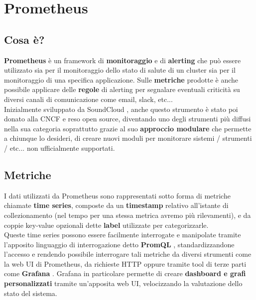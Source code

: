 \chapter{Prometheus} \label{chap:Prometheus}

\section{Cosa è?}
\textbf{Prometheus} è un framework di \textbf{monitoraggio} e di \textbf{alerting} che può essere utilizzato sia per il monitoraggio dello stato di salute di un cluster sia per il monitoraggio di una specifica applicazione. Sulle \textbf{metriche} prodotte è anche possibile applicare delle \textbf{regole} di alerting per segnalare eventuali criticità su diversi canali di comunicazione come email, slack, etc... \\
Inizialmente sviluppato da SoundCloud \cite{SoundCloud}, anche questo strumento è stato poi donato alla CNCF \cite{CNCF} e reso open source, diventando uno degli strumenti più diffusi nella sua categoria soprattutto grazie al suo \textbf{approccio modulare} che permette a chiunque lo desideri, di creare nuovi moduli per monitorare sistemi / strumenti / etc... non ufficialmente supportati.


\section{Metriche}
I dati utilizzati da Prometheus sono rappresentati sotto forma di metriche chiamate \textbf{time series}, composte da un \textbf{timestamp} relativo all'istante di collezionamento (nel tempo per una stessa metrica avremo più rilevamenti), e da coppie key-value opzionali dette \textbf{label} utilizzate per categorizzarle. \\
Queste time series possono essere facilmente interrogate e manipolate tramite l'apposito linguaggio di interrogazione detto \textbf{PromQL} \cite{Prometheus-query-language}, standardizzandone l'accesso e rendendo possibile interrogare tali metriche da diversi strumenti come la web UI di Prometheus, da richieste HTTP oppure tramite tool di terze parti come \textbf{Grafana} \cite{Grafana}. Grafana in particolare permette di creare \textbf{dashboard e grafi personalizzati} tramite un'apposita web UI, velocizzando la valutazione dello stato del sistema. 

